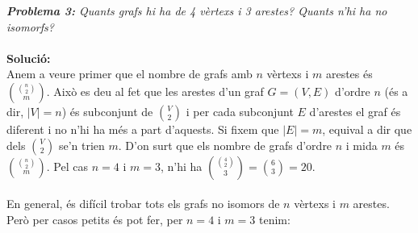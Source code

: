 \documentclass[10pt]{article}
\begin{document}
\large
\textsl{\textbf{Problema 3:} Quants grafs hi ha de 4 vèrtexs i 3 arestes? Quants n'hi ha no isomorfs?} \\ \\
\textbf{Solució:} \\
\normalsize
Anem a veure primer que el nombre de grafs amb $n$ vèrtexs i $m$ arestes és ${{n}\choose{2}}\choose{m}$. Això es deu al fet que les arestes d'un graf $G=(V, E)$ d'ordre $n$ (és a dir, $|V|=n$) és subconjunt de ${V}\choose{2}$ i per cada subconjunt $E$ d'arestes el graf és diferent i no n'hi ha més a part d'aquests. Si fixem que $|E| = m$, equival a dir que dels ${V}\choose{2}$ se'n trien $m$. D'on surt que els nombre de grafs d'ordre $n$ i mida $m$ és ${{n}\choose{2}}\choose{m}$. Pel cas $n=4$ i $m=3$, n'hi ha ${{{4}\choose{2}}\choose{3}} = {{6}\choose{3}} = 20$. \\ \\
En general, és difícil trobar tots els grafs no isomors de $n$ vèrtexs i $m$ arestes. Però per casos petits és pot fer, per $n=4$ i $m=3$ tenim:

\end{document}
